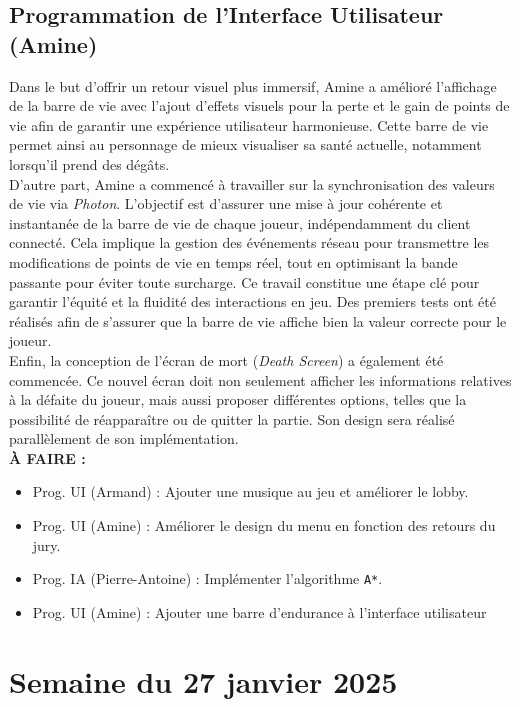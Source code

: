 \documentclass{report}
\begin{document}
\subsection*{Programmation de l'Interface Utilisateur (Amine)}
Dans le but d’offrir un retour visuel plus immersif, Amine a amélioré l’affichage de la barre de vie avec l’ajout d’effets visuels pour la perte et le gain de points de vie afin de garantir une expérience utilisateur harmonieuse. Cette barre de vie permet ainsi au personnage de mieux visualiser sa santé actuelle, notamment lorsqu'il prend des dégâts.
\\[0.4cm]
D'autre part, Amine a commencé à travailler sur la synchronisation des valeurs de vie via \textit{Photon}. L’objectif est d’assurer une mise à jour cohérente et instantanée de la barre de vie de chaque joueur, indépendamment du client connecté. Cela implique la gestion des événements réseau pour transmettre les modifications de points de vie en temps réel, tout en optimisant la bande passante pour éviter toute surcharge. Ce travail constitue une étape clé pour garantir l’équité et la fluidité des interactions en jeu. Des premiers tests ont été réalisés afin de s’assurer que la barre de vie affiche bien la valeur correcte pour le joueur.
\\[0.4cm]
Enfin, la conception de l’écran de mort (\textit{Death Screen}) a également été commencée. Ce nouvel écran doit non seulement afficher les informations relatives à la défaite du joueur, mais aussi proposer différentes options, telles que la possibilité de réapparaître ou de quitter la partie. Son design sera réalisé parallèlement de son implémentation.
\\[1cm]
\textbf{À FAIRE :}
\begin{itemize}
    \item Prog. UI (Armand) : Ajouter une musique au jeu et améliorer le lobby.
    \item Prog. UI (Amine) : Améliorer le design du menu en fonction des retours du jury.
    \item Prog. IA (Pierre-Antoine) : Implémenter l'algorithme \texttt{A*}.
    \item Prog. UI (Amine) : Ajouter une barre d'endurance à l'interface utilisateur
\end{itemize}







\newpage
\section{Semaine du 27 janvier 2025}
\end{document}
